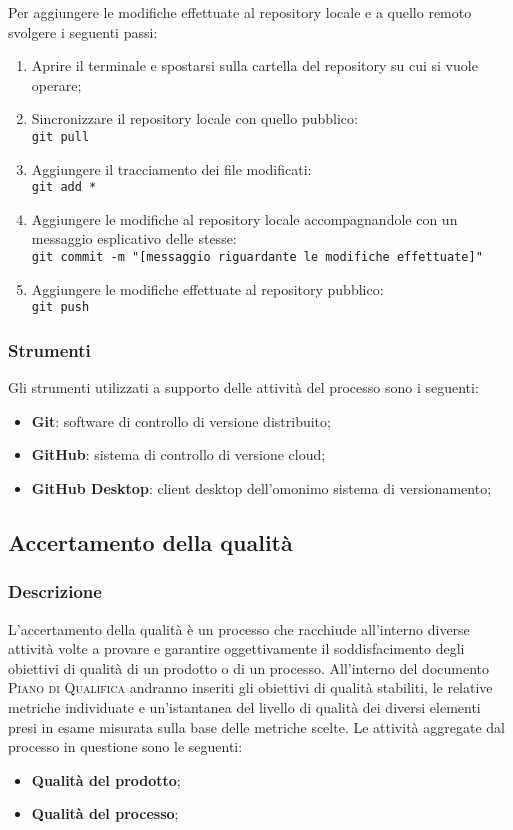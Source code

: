 Per aggiungere le modifiche effettuate al repository locale e a quello remoto svolgere i seguenti passi:
\begin{enumerate}
	\item Aprire il terminale e spostarsi sulla cartella del repository su cui si vuole operare;
	\item Sincronizzare il repository locale con quello pubblico:\\
		\texttt{git pull}
	\item Aggiungere il tracciamento dei file modificati:\\
		\texttt{git add *}
	\item Aggiungere le modifiche al repository locale accompagnandole con un messaggio esplicativo delle stesse:\\
		\texttt{git commit -m "[messaggio riguardante le modifiche effettuate]"}
	\item Aggiungere le modifiche effettuate al repository pubblico:\\
		\texttt{git push}
\end{enumerate}

\subsubsection{Strumenti}
\label{sub:gestione_configurazione:strumenti}

Gli strumenti utilizzati a supporto delle attività del processo sono i seguenti:
\begin{itemize}
	\item \textbf{Git}: software di controllo di versione distribuito;
	\item \textbf{GitHub}: sistema di controllo di versione cloud;
	\item \textbf{GitHub Desktop}: client desktop dell'omonimo sistema di versionamento;
\end{itemize}



\subsection{Accertamento della qualità}
\label{sub:accertamento_qualita}

\subsubsection{Descrizione}
L'accertamento della qualità è un processo che racchiude all'interno diverse attività volte a provare e garantire oggettivamente il
soddisfacimento degli obiettivi di qualità di un prodotto o di un processo. All'interno del documento \textsc{Piano di Qualifica}
andranno inseriti gli obiettivi di qualità stabiliti, le
relative metriche individuate e un'istantanea del livello di qualità dei diversi elementi presi in esame misurata sulla base delle
metriche scelte. Le attività aggregate dal processo in questione sono le seguenti:
\begin{itemize}
    \item \textbf{Qualità del prodotto};
    \item \textbf{Qualità del processo};
\end{itemize}


